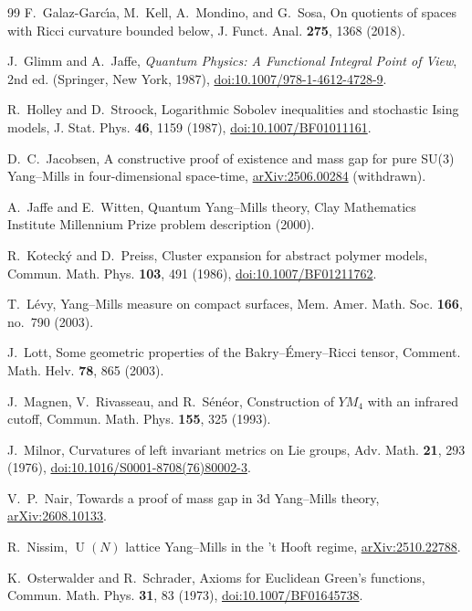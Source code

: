 \documentclass[aps,prd,twocolumn,superscriptaddress,nofootinbib,floatfix]{revtex4-2}
\theoremstyle{definition}
\theoremstyle{remark}
\DeclareMathOperator{\U}{U}
\begin{document}
\begin{thebibliography}{99}
F.~Galaz-Garc\'{\i}a, M.~Kell, A.~Mondino, and G.~Sosa, On quotients of
spaces with Ricci curvature bounded below, J. Funct. Anal. \textbf{275},
1368 (2018).

J.~Glimm and A.~Jaffe, \emph{Quantum Physics: A Functional Integral Point
of View}, 2nd ed. (Springer, New York, 1987),
\href{https://doi.org/10.1007/978-1-4612-4728-9}{doi:10.1007/978-1-4612-4728-9}.

R.~Holley and D.~Stroock, Logarithmic Sobolev inequalities and stochastic
Ising models, J. Stat. Phys. \textbf{46}, 1159 (1987),
\href{https://doi.org/10.1007/BF01011161}{doi:10.1007/BF01011161}.

D.~C.~Jacobsen, A constructive proof of existence and mass gap for pure
SU(3) Yang--Mills in four-dimensional space-time,
\href{https://arxiv.org/abs/2506.00284}{arXiv:2506.00284} (withdrawn).

A.~Jaffe and E.~Witten, Quantum Yang--Mills theory, Clay Mathematics
Institute Millennium Prize problem description (2000).

R.~Koteck\'y and D.~Preiss, Cluster expansion for abstract polymer models,
Commun. Math. Phys. \textbf{103}, 491 (1986),
\href{https://doi.org/10.1007/BF01211762}{doi:10.1007/BF01211762}.

T.~L\'evy, Yang--Mills measure on compact surfaces, Mem. Amer. Math. Soc.
\textbf{166}, no.~790 (2003).

J.~Lott, Some geometric properties of the Bakry--\'Emery--Ricci tensor,
Comment. Math. Helv. \textbf{78}, 865 (2003).

J.~Magnen, V.~Rivasseau, and R.~S\'en\'eor, Construction of $YM_4$ with an
infrared cutoff, Commun. Math. Phys. \textbf{155}, 325 (1993).

J.~Milnor, Curvatures of left invariant metrics on Lie groups, Adv. Math.
\textbf{21}, 293 (1976),
\href{https://doi.org/10.1016/S0001-8708(76)80002-3}{doi:10.1016/S0001-8708(76)80002-3}.

V.~P.~Nair, Towards a proof of mass gap in 3d Yang--Mills theory,
\href{https://arxiv.org/abs/2608.10133}{arXiv:2608.10133}.

R.~Nissim, $\U(N)$ lattice Yang--Mills in the 't Hooft regime,
\href{https://arxiv.org/abs/2510.22788}{arXiv:2510.22788}.

K.~Osterwalder and R.~Schrader, Axioms for Euclidean Green's functions,
Commun. Math. Phys. \textbf{31}, 83 (1973),
\href{https://doi.org/10.1007/BF01645738}{doi:10.1007/BF01645738}.


\end{thebibliography}
\end{document}
